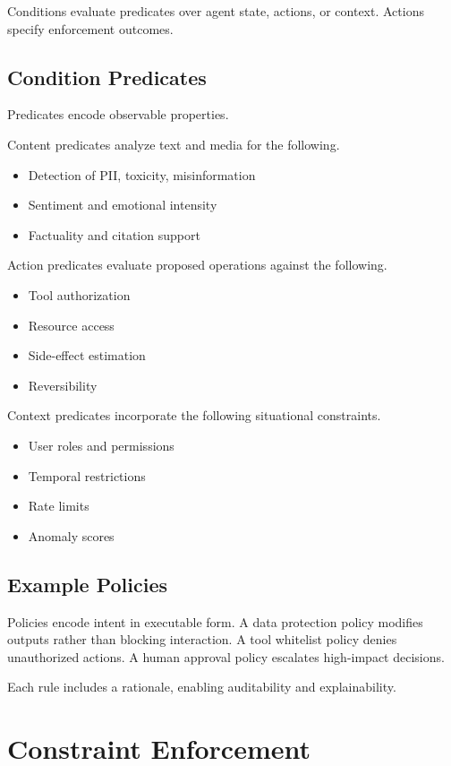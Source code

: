 Conditions evaluate predicates over agent state, actions, or context. Actions specify enforcement outcomes.

\subsection{Condition Predicates}

Predicates encode observable properties.

Content predicates analyze text and media for the following.
\begin{itemize}
\item Detection of PII, toxicity, misinformation
\item Sentiment and emotional intensity
\item Factuality and citation support
\end{itemize}

Action predicates evaluate proposed operations against the following.
\begin{itemize}
\item Tool authorization
\item Resource access
\item Side-effect estimation
\item Reversibility
\end{itemize}

Context predicates incorporate the following situational constraints.
\begin{itemize}
\item User roles and permissions
\item Temporal restrictions
\item Rate limits
\item Anomaly scores
\end{itemize}

\subsection{Example Policies}

Policies encode intent in executable form. A data protection policy modifies outputs rather than blocking interaction. A tool whitelist policy denies unauthorized actions. A human approval policy escalates high-impact decisions.

Each rule includes a rationale, enabling auditability and explainability.

\section{Constraint Enforcement}

